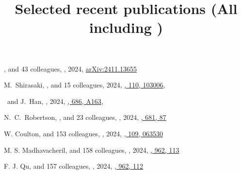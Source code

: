 \title{Selected recent publications {\small (All including \myself)}}


\noindent



\begin{etaremune}

\item
\myself, and 43 colleagues,
,
2024, \href{https://ui.adsabs.harvard.edu/abs/2024arXiv241113655S/abstract}{arXiv:2411.13655}
\submitted{\aap}

\item
M.~Shirasaki, \myself, and 15 colleagues,
2024, \href{https://ui.adsabs.harvard.edu/abs/2024arXiv240708201S/abstract}{\prd, 110, 103006},

\item
\myself\ and J.~Han,
,
2024, \href{https://ui.adsabs.harvard.edu/abs/2024A&A...686A.163S/abstract}{\aap, 686, A163},
   
\item
N.~C.~Robertson, \myself, and 23 colleagues,
,
2024, \href{https://ui.adsabs.harvard.edu/abs/2024A&A...681A..87R/abstract}{\aap, 681, 87}

\item
W. Coulton, and 153 colleagues,
,
2024, \href{https://ui.adsabs.harvard.edu/abs/2024PhRvD.109f3530C}{\prd, 109, 063530}

\item
M. S. Madhavacheril, and 158 colleagues,
,
2024, \href{https://ui.adsabs.harvard.edu/abs/2024ApJ...962..113M}{\apj, 962, 113}

\item
F. J. Qu, and 157 colleagues,
,
2024, \href{https://ui.adsabs.harvard.edu/abs/2024ApJ...962..112Q}{\apj, 962, 112}


\end{etaremune}
